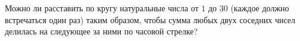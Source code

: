Можно ли расставить по кругу натуральные числа от $1$ до $30$ (каждое должно встречаться один раз) таким образом, чтобы сумма любых двух соседних чисел делилась на следующее за ними по часовой стрелке?